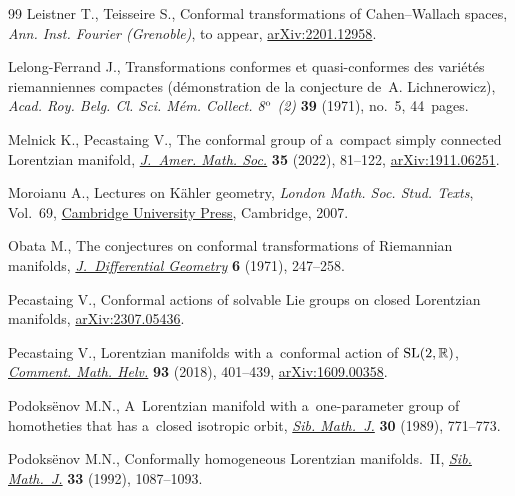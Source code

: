 \documentclass[pdftex]{sigma}
\numberwithin{equation}{section}
\newcommand{\1}{\mathbf{1}}
\newcommand{\+}{\oplus}
\renewcommand{\=}{\equiv}
\begin{document}
\begin{thebibliography}{99}
Leistner T., Teisseire S., Conformal transformations of {C}ahen--{W}allach
 spaces, \textit{Ann. Inst. Fourier (Grenoble)}, {t}o appear,
 \href{https://arxiv.org/abs/2201.12958}{arXiv:2201.12958}.

Lelong-Ferrand J., Transformations conformes et quasi-conformes des
 vari\'et\'es riemanniennes compactes (d\'emonstration de la conjecture
 de~{A}. {L}ichnerowicz), \textit{Acad. Roy. Belg. Cl. Sci. M\'em. Collect.
 8$^{\rm o}$ (2)} \textbf{39} (1971), no.~5, 44~pages.

Melnick K., Pecastaing V., The conformal group of a~compact simply connected
 {L}orentzian manifold, \href{https://doi.org/10.1090/jams/976}{\textit{J.~Amer. Math. Soc.}} \textbf{35} (2022),
 81--122, \href{https://arxiv.org/abs/1911.06251}{arXiv:1911.06251}.

Moroianu A., Lectures on {K}\"ahler geometry, \textit{London Math. Soc. Stud.
 Texts}, Vol.~69, \href{https://doi.org/10.1017/CBO9780511618666}{Cambridge University Press}, Cambridge, 2007.

Obata M., The conjectures on conformal transformations of {R}iemannian
 manifolds, \href{https://doi.org/10.4310/jdg/1214430407}{\textit{J.~Differential Geometry}} \textbf{6} (1971), 247--258.

Pecastaing V., Conformal actions of solvable {L}ie groups on closed
 {L}orentzian manifolds, \href{https://arxiv.org/abs/2307.05436}{arXiv:2307.05436}.

Pecastaing V., Lorentzian manifolds with a~conformal action of {${\rm
 SL}(2,\mathbb{R})$}, \href{https://doi.org/10.4171/CMH/439}{\textit{Comment. Math. Helv.}} \textbf{93} (2018),
 401--439, \href{https://arxiv.org/abs/1609.00358}{arXiv:1609.00358}.

Podoks\"enov M.N., A~{L}orentzian manifold with a~one-parameter group of
 homotheties that has a~closed isotropic orbit, \href{https://doi.org/10.1007/BF00971269}{\textit{Sib. Math.~J.}}
 \textbf{30} (1989), 771--773.

Podoks\"enov M.N., Conformally homogeneous {L}orentzian manifolds.~{II},
 \href{https://doi.org/10.1007/BF00971031}{\textit{Sib. Math.~J.}} \textbf{33} (1992), 1087--1093.

\end{thebibliography}\LastPageEnding
\end{document}
